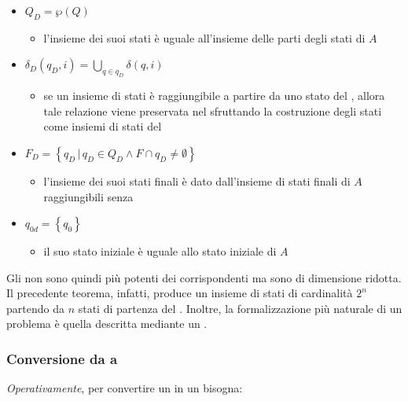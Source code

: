 \documentclass[italian, 10pt]{article}
\begin{document}
\begin{itemize}
  \item \(Q_D = \wp(Q)\)
        \begin{itemize}[label=\(\rightarrow\)]
          \item l'insieme dei suoi stati è uguale all'insieme delle parti degli stati di \(A\)
        \end{itemize}
  \item \(\displaystyle \delta_D(q_D, i) = \bigcup_{q \in q_D} \delta(q, i) \)
        \begin{itemize}[label=\(\rightarrow\)]
          \item se un insieme di stati è raggiungibile a partire da uno stato del \NFA, allora tale relazione viene preservata nel \DFA sfruttando la costruzione degli stati come insiemi di stati del \NFA
        \end{itemize}
  \item \(F_D = \left\{q_D \, | \, q_D \in Q_D \land F \cap q_D \neq \emptyset \right\}\)
        \begin{itemize}[label=\(\rightarrow\)]
          \item l'insieme dei suoi stati finali è dato dall'insieme di stati finali di \(A\) raggiungibili senza \ND
        \end{itemize}
  \item \(q_{0d} = \left\{q_0\right\}\)
        \begin{itemize}[label=\(\rightarrow\)]
          \item il suo stato iniziale è uguale allo stato iniziale di \(A\)
        \end{itemize}
\end{itemize}

Gli \NFA non sono quindi più potenti dei corrispondenti \DFA ma sono di dimensione ridotta.
Il precedente teorema, infatti, produce un insieme di stati di cardinalità \(2^n\) partendo da \(n\) stati di partenza del \NFA.
Inoltre, la formalizzazione più naturale di un problema è quella descritta mediante un \NFA.

\subsubsection{Conversione da \NFA a \DFA}
\label{sec:conversione-nfa-dfa}

\textit{Operativamente}, per convertire un \FSA in un \DFA bisogna:
\end{document}
